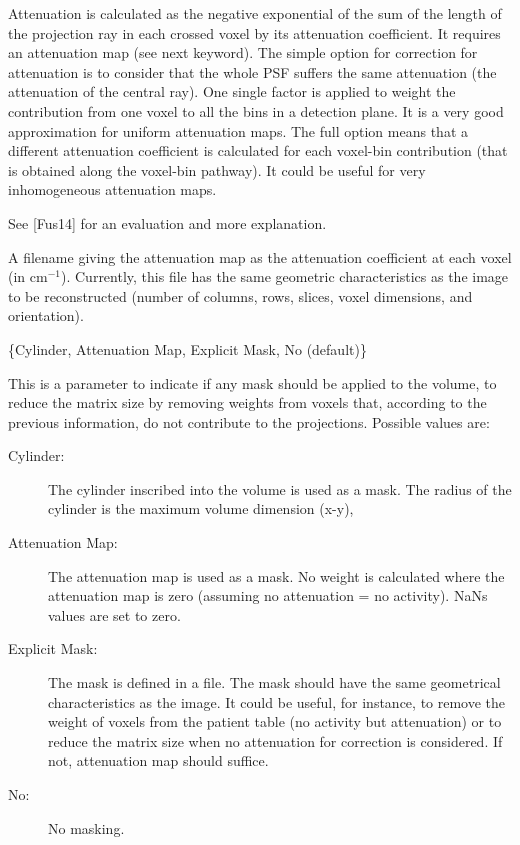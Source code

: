 \documentclass{article}
\begin{document}
{{\begin{description}
Attenuation is calculated as the negative exponential of the sum of the length of the projection ray in each crossed voxel by its attenuation coefficient. It requires an attenuation map (see next keyword). The simple option for correction for attenuation is to consider that the whole PSF suffers the same attenuation (the attenuation of the central ray). One single factor is applied to weight the contribution from one voxel to all the bins in a detection plane. It is a very good approximation for uniform attenuation maps. The full option means that a different attenuation coefficient is calculated for each voxel-bin contribution (that is obtained along the voxel-bin pathway). It could be useful for very inhomogeneous attenuation maps.

See [Fus14] for an evaluation and more explanation.

\item[attenuation map] \hfill

A filename giving the attenuation map as the attenuation coefficient at each voxel (in $\mathrm{cm}^{-1}$). Currently, this file has the same geometric characteristics as the image to be reconstructed (number of columns, rows, slices, voxel dimensions, and orientation).

\item[mask type] \{Cylinder, Attenuation Map, Explicit Mask, No (default)\}

This is a parameter to indicate if any mask should be applied to the volume, to reduce the matrix size by removing weights from voxels that, according to the previous information, do not contribute to the projections. Possible values are:
\begin{description}
\item[Cylinder:] The cylinder inscribed into the volume is used as a mask. The radius of the cylinder is the maximum volume dimension (x-y),
\item[Attenuation Map:] The attenuation map is used as a mask. No weight is calculated where the attenuation map is zero (assuming no attenuation = no activity). NaNs values are set to zero.
\item[Explicit Mask:] The mask is defined in a file. The mask should have the same geometrical characteristics as the image. It could be useful, for instance, to remove the weight of voxels from the patient table (no activity but attenuation) or to reduce the matrix size when no attenuation for correction is considered. If not, attenuation map should suffice.
\item[No:] No masking.
\end{description}


\end{description}}}
\end{document}
